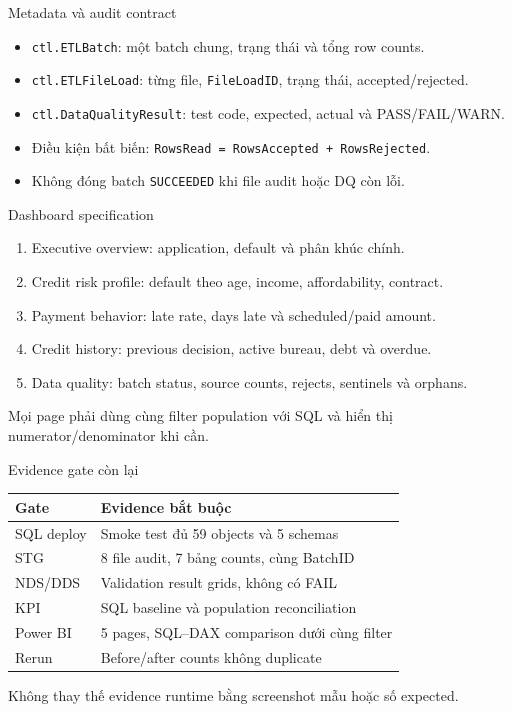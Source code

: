 \documentclass[aspectratio=169,11pt]{beamer}
\begin{document}
\begin{frame}{Metadata và audit contract}
\begin{itemize}
  \item \texttt{ctl.ETLBatch}: một batch chung, trạng thái và tổng row counts.
  \item \texttt{ctl.ETLFileLoad}: từng file, \texttt{FileLoadID}, trạng thái, accepted/rejected.
  \item \texttt{ctl.DataQualityResult}: test code, expected, actual và PASS/FAIL/WARN.
  \item Điều kiện bất biến: \texttt{RowsRead = RowsAccepted + RowsRejected}.
  \item Không đóng batch \texttt{SUCCEEDED} khi file audit hoặc DQ còn lỗi.
\end{itemize}
\end{frame}

\begin{frame}{Dashboard specification}
\begin{enumerate}
  \item Executive overview: application, default và phân khúc chính.
  \item Credit risk profile: default theo age, income, affordability, contract.
  \item Payment behavior: late rate, days late và scheduled/paid amount.
  \item Credit history: previous decision, active bureau, debt và overdue.
  \item Data quality: batch status, source counts, rejects, sentinels và orphans.
\end{enumerate}
\vfill
\small Mọi page phải dùng cùng filter population với SQL và hiển thị numerator/denominator khi cần.
\end{frame}

\begin{frame}{Evidence gate còn lại}
\begin{tabular}{p{}p{}}
\toprule
Gate & Evidence bắt buộc \\
\midrule
SQL deploy & Smoke test đủ 59 objects và 5 schemas \\
STG & 8 file audit, 7 bảng counts, cùng BatchID \\
NDS/DDS & Validation result grids, không có FAIL \\
KPI & SQL baseline và population reconciliation \\
Power BI & 5 pages, SQL--DAX comparison dưới cùng filter \\
Rerun & Before/after counts không duplicate \\
\bottomrule
\end{tabular}
\vfill
\centering
\alert{Không thay thế evidence runtime bằng screenshot mẫu hoặc số expected.}
\end{frame}
\end{document}
